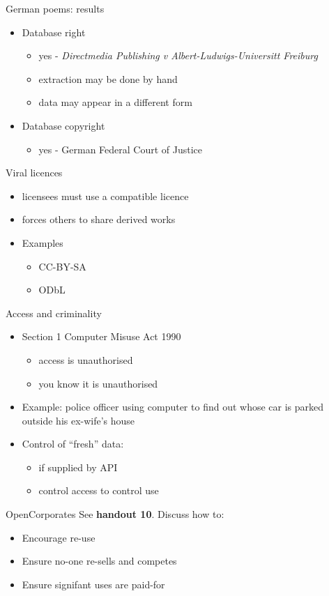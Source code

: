 \documentclass[aspectratio=169]{beamer}
\begin{document}
  \begin{frame}{German poems: results}
    \begin{itemize}
    \item Database right
      \begin{itemize}
      \item yes - \protect\textit{Directmedia Publishing v Albert-Ludwigs-Universitt Freiburg}
      \item extraction may be done by hand
      \item data may appear in a different form
      \end{itemize}
    \item Database copyright
      \begin{itemize}
      \item yes - German Federal Court of Justice
      \end{itemize}
    \end{itemize}
  \end{frame}

  \begin{frame}{Viral licences}
    \begin{itemize}
    \item licensees must use a compatible licence
    \item forces others to share derived works
    \item Examples
      \begin{itemize}
      \item CC-BY-SA
      \item ODbL
      \end{itemize}
    \end{itemize}
  \end{frame}

  \begin{frame}{Access and criminality}
    \begin{itemize}
    \item Section 1 Computer Misuse Act 1990
      \begin{itemize}
      \item access is unauthorised
      \item you know it is unauthorised
      \end{itemize}
    \item Example: police officer using computer to find out whose car is parked outside his ex-wife's house
    \item Control of ``fresh'' data:
      \begin{itemize}
      \item if supplied by API
      \item control access to control use
      \end{itemize}
    \end{itemize}
  \end{frame}

  \begin{frame}{OpenCorporates}
See {\protect\textbf{handout 10}.} Discuss how to:
    \begin{itemize}
    \item Encourage re-use
    \item Ensure no-one re-sells and competes
    \item Ensure signifant uses are paid-for
    \end{itemize}
    
  \end{frame}
\end{document}

